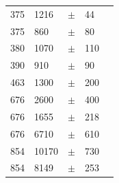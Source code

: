 \documentclass[9pt]{extarticle}   	%
\begin{document}
\begin{table}
\begin{center}
\begin{tabular}{lllll}
 375    &     1216 & $\pm$ & 44    & \citet{1989ApJ...340L..69W}\\
 375    &      860 & $\pm$ & 80    & \citet{1994AJ....108..661J}\\
 380    &     1070 & $\pm$ & 110   & \citet{1990ApJ...357..606A}\\
 390    &      910 & $\pm$ & 90    & \citet{1991ApJ...381..250B}\\
 463    &     1300 & $\pm$ & 200   & \citet{1990ApJ...357..606A}\\
 676    &     2600 & $\pm$ & 400   & \citet{1990ApJ...357..606A}\\
 676    &     1655 & $\pm$ & 218   & \citet{2005ApJ...631.1134A}\\
 676    &     6710 & $\pm$ & 610   & \citet{1989ApJ...340L..69W}\\
 854    &    10170 & $\pm$ & 730   & \citet{1989ApJ...340L..69W}\\
 854    &     8149 & $\pm$ & 253   & \citet{2005ApJ...631.1134A}\\
 \end{tabular}
\end{center}
\label{default}
\end{table}%

\clearpage
\end{document}
